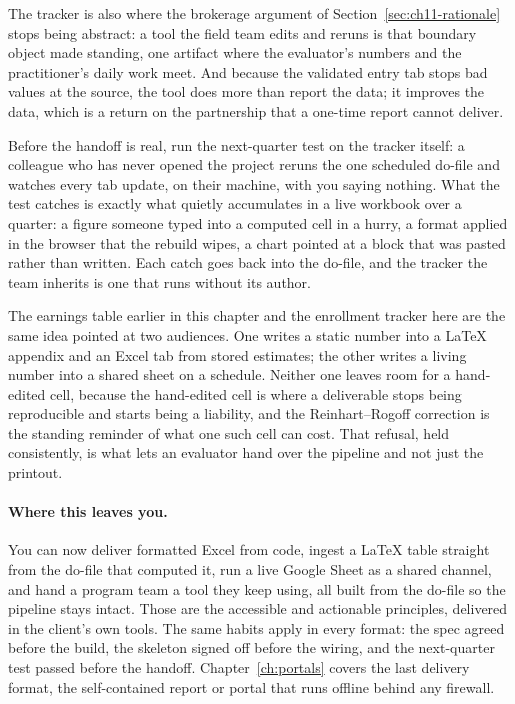 \documentclass[
    a4paper,
    fontsize=10pt,
    twoside=true,
    numbers=noenddot,
]{kaobook}
\begin{document}
The tracker is also where the brokerage argument of Section~\ref{sec:ch11-rationale} stops being abstract: a tool the field team edits and reruns is that boundary object made standing, one artifact where the evaluator's numbers and the practitioner's daily work meet. And because the validated entry tab stops bad values at the source, the tool does more than report the data; it improves the data, which is a return on the partnership that a one-time report cannot deliver.

Before the handoff is real, run the next-quarter test on the tracker itself: a colleague who has never opened the project reruns the one scheduled do-file and watches every tab update, on their machine, with you saying nothing. What the test catches is exactly what quietly accumulates in a live workbook over a quarter: a figure someone typed into a computed cell in a hurry, a format applied in the browser that the rebuild wipes, a chart pointed at a block that was pasted rather than written. Each catch goes back into the do-file, and the tracker the team inherits is one that runs without its author.

The earnings table earlier in this chapter and the enrollment tracker here are the same idea pointed at two audiences. One writes a static number into a \LaTeX{} appendix and an Excel tab from stored estimates; the other writes a living number into a shared sheet on a schedule. Neither one leaves room for a hand-edited cell, because the hand-edited cell is where a deliverable stops being reproducible and starts being a liability, and the Reinhart--Rogoff correction \parencite{herndon2014debt} is the standing reminder of what one such cell can cost. That refusal, held consistently, is what lets an evaluator hand over the pipeline and not just the printout.

\paragraph{Where this leaves you.} You can now deliver formatted Excel from code, ingest a \LaTeX{} table straight from the do-file that computed it, run a live Google Sheet as a shared channel, and hand a program team a tool they keep using, all built from the do-file so the pipeline stays intact. Those are the accessible and actionable principles, delivered in the client's own tools. The same habits apply in every format: the spec agreed before the build, the skeleton signed off before the wiring, and the next-quarter test passed before the handoff. Chapter~\ref{ch:portals} covers the last delivery format, the self-contained report or portal that runs offline behind any firewall.
\end{document}
